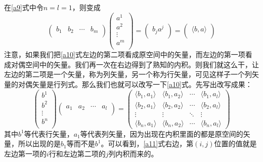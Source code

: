 \documentclass[11pt,a4paper,openany]{book}%
\theoremstyle{plain}%
\begin{document}
在\eqref{a9}式中令$n=l=1$，则变成
\begin{equation}
\label{a10}
\begin{pmatrix}
b_{1} & b_{2} & \cdots & b_{m}\\
\end{pmatrix}
\begin{pmatrix}
a^{1}\\
a^{2}\\
\vdots \\
a^{m}\\
\end{pmatrix}
=
\begin{pmatrix}
b_ja^{j}\\
\end{pmatrix}
=\begin{pmatrix}
\langle b,a \rangle \\
\end{pmatrix}
\end{equation}
注意，如果我们把\eqref{a10}式左边的第二项看成原空间中的矢量，而左边的第一项看成对偶空间中的矢量。我们再一次在右边得到了熟知的内积。则我们就这么干，让左边的第二项是一个矢量，称为列矢量，另一个称为行矢量，可见这样子一个列矢量的对偶矢量是行列式。那么我们也就可以改写一下\eqref{a10}式。先写出改写成果：
\begin{equation}
\label{a11}
\begin{pmatrix}
b^{1}\\
b^{2} \\
\vdots \\
b^{n}\\
\end{pmatrix}
\begin{pmatrix}
a_{1} & a_{2} & \cdots & a_{l}\\
\end{pmatrix}
=
\begin{pmatrix}
	\langle b_1,a_1 \rangle& \langle b_1,a_2 \rangle & \cdots & \langle b_1,a_l \rangle\\
	\langle b_2,a_1 \rangle& \langle b_2,a_2 \rangle & \cdots & \langle b_2,a_l \rangle\\
	\vdots & \vdots & \ddots & \vdots \\
	\langle b_n,a_1 \rangle& \langle b_n,a_2 \rangle & \cdots & \langle b_n,a_l \rangle
\end{pmatrix}
\end{equation}
其中$b^1$等代表行矢量，$a_1$等代表列矢量，因为出现在内积里面的都是原空间的矢量，所以出现的是$b_1$等而不是$b^1$。可以看到，\eqref{a11}式右边，第$(i,j)$位置的值就是左边第一项的$i$行和左边第二项的$j$列内积而来的。
\end{document}
